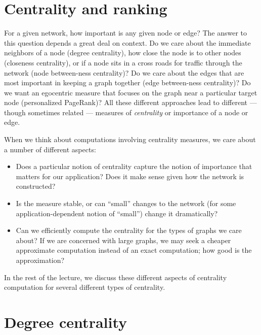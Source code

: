 \documentclass[12pt, leqno]{article} %
\begin{document}

\section{Centrality and ranking}



For a given network, how important is any given node or edge?  The
answer to this question depends a great deal on context.  Do we care
about the immediate neighbors of a node (degree centrality), how close
the node is to other nodes (closeness centrality), or if a node sits
in a cross roads for traffic through the network (node between-ness
centrality)?  Do we care about the edges that are most important in
keeping a graph together (edge between-ness centrality)?
Do we want an egocentric measure that focuses on the
graph near a particular target node (personalized PageRank)?
All these different approaches lead to different --- though sometimes
related --- measures of {\em centrality} or importance of a node or edge.

When we think about computations involving centrality measures, we
care about a number of different aspects:
\begin{itemize}
\item
  Does a particular notion of centrality capture the notion of
  importance that matters for our application?  Does it make sense
  given how the network is constructed?
\item
  Is the measure stable, or can ``small'' changes to the network
  (for some application-dependent notion of ``small'') change it
  dramatically?
\item
  Can we efficiently compute the centrality for the types of graphs we
  care about?  If we are concerned with large graphs, we may seek a
  cheaper approximate computation instead of an exact computation;
  how good is the approximation?
\end{itemize}
In the rest of the lecture, we discuss these different aspects of
centrality computation for several different types of centrality.

\section{Degree centrality}
\end{document}
